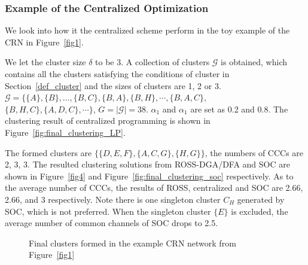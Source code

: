 \documentclass[10pt,journal,compsoc]{IEEEtran}
\theoremstyle{mytheoremstyle}
\theoremstyle{mytheoremstyle}
\theoremstyle{mytheoremstyle}
\begin{document}
\subsubsection{Example of the Centralized Optimization}
We look into how it the centralized scheme perform in the toy example of the CRN in Figure~\ref{fig1}.

We let the cluster size $\delta$ to be 3.
A collection of clusters $\mathcal{G}$ is obtained, which contains all the clusters satisfying the conditions of cluster in Section~\ref{def_cluster} and the sizes of clusters are 1, 2 or 3. 
$\mathcal{G}=\{\{A\}, \{B\},\dots,\{B,C\},\{B,A\},\{B,H\},\cdots,\{B,A,C\},$\\$\{B,H,C\}, \{A,D,C\},\cdots\}$, $G = |\mathcal{G}|=38$.
$\alpha_1$ and $\alpha_1$ are set as 0.2 and 0.8. 
The clustering result of centralized programming is shown in Figure~\ref{fig:final_clustering_LP}.

The formed clusters are $\{\{D,E,F\},\{A,C,G\},\{H,G\}\}$, the numbers of CCCs are 2, 3, 3.
The resulted clustering solutions from ROSS-DGA/DFA and SOC are shown in  Figure~\ref{fig4} and Figure~\ref{fig:final_clustering_soc} respectively.%
As to the average number of CCCs, the results of ROSS, centralized and SOC are 2.66, 2.66, and 3 respectively. 
Note there is one singleton cluster $C_H$ generated by SOC, which is not preferred.
When the singleton cluster $\{E\}$ is excluded, the average number of common channels of SOC drops to 2.5. 
\begin{figure}[ht]
\begin{center}
\hspace{0.15 in}
\end{center}
\caption{Final clusters formed in the example CRN network from Figure~\ref{fig1}}
\label{fig:final_clustering}
\end{figure}
\end{document}

